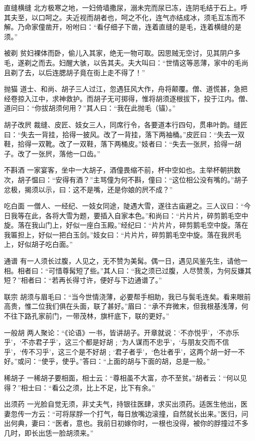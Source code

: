 \documentclass[12pt,UTF8]{ctexbook}
\begin{document}
直缝横缝
北方极寒之地，一妇倚墙撒尿，溺未完而尿已冻，连阴毛结于石上。呼其夫至，以口呵之。夫近视而胡者也，呵之不化，连气亦结成冰，须毛互冻而不解。乃命家僮凿开，吩咐曰：“看仔细子下凿，连着直缝的是毛，连着横缝的是须。”

被剃
贫妇裸体而卧，偷儿入其家，绝无一物可取。因思贼无空讨，见其阴户多毛，遂剃之而去。妇醒大骇，以告其夫。夫大叫曰：“世情这等恶薄，家中的毛尚且剃了去，以后连腮胡子竟在街上走不得了！”

抛猫
道士、和尚、胡子三人过江，忽遇狂风大作，舟将颠覆。僧、道慌甚，急把经卷掠入江中，求神救护。而胡子无可掷得，惟将胡须逐根拔下，投于江内。僧、道问曰：“你拔胡须何用？”其人曰：“我在此抛毛（锚）。”

胡子改屄
裁缝、皮匠、妓女三人，同席行令，各要道本行四句，贯串叶韵。缝匠曰：“失去一背挂，拾得一披风。改了一背挂，落下两袖桶。”皮匠曰：“失去一双鞋，拾得一双靴。改了一双鞋，落下两桶皮。”妓者曰：“失去一张屄，拾得一胡子。改了一张屄，落他一口齿。”

不斟酒
一家宴客，坐中一大胡子，酒僮畏缩不前，杯中空如也。主举杯朝拱数次，胡子愠曰：“安得有酒？”主骂僮为何不斟，僮曰：“这位相公没有嘴的。”胡子忿极，揭须以示，曰：这不是嘴，还是你娘的屄不成？”

吃白面
一僧人、一经纪、一妓女同途，陡遇大雪，遂往古庙避之。三人议曰：“今日我等在此，各将大雪为题，要插入自家本色。”和尚曰：“片片片，碎剪鹅毛空中旋。落在我山门上，好似一座白玉殿。”经纪曰：“片片片，碎剪鹅毛空中旋。落在我匾担上，好似一把白玉剑。”妓女曰：“片片片，碎剪鹅毛空中旋。落在我屄毛上，好似胡子吃白面。”

通谱
有一人须长过腹，人见之，无不赞为美髯。偶一日，遇见风鉴先生，请他一相。相者曰：“可惜尊髯短了些。”其人曰：“我之须已过腹，人尽赞羡，为何反嫌其短？”相者曰：“若再长得寸许，便好与下边通谱了。”

联宗
胡须与眉毛曰：“当今世情浇薄，必要帮手相助，我已与鬓毛连矣。看来眼前高贵，惟二位我们俱在头面，联了甚好。”眉曰：“承不弃微末，但我根基浅薄，何不往下路孔家前门，一带茂林，旗杆底下，联的更好。”

一般胡
两人聚论：“《论语》一书，皆讲胡子。开章就说：‘不亦悦乎’，‘不亦乐乎’，‘不亦君子乎’，这三个都是好胡﹔‘为人谋而不忠乎’，‘与朋友交而不信乎’，‘传不习乎’，这三个是不好胡﹔‘君子者乎’，‘色壮者乎’，这两个胡一好一不好。”或问：“使乎，使乎。”答曰：“上面的胡与下面的胡，总是一般。”

稀胡子
一稀胡子要相面，相士云：“尊相虽不大富，亦不至贫。”胡者云：“何以见得？”相士曰：“看公之须，比上不足，比下有余。”

出须药
一光脸自觉无须，非丈夫气，持银往医肆，求买出须药。适医生他出，医妻忽传一方云：“可将尿脬一个打气，每日放嘴边滚撞，自然就长出来。”医归，问出何典，妻曰：“医者，意也。我前日初嫁你时，一根也没得，被你的脬撞过不多几时，即长出恁一脸胡须来。”
\end{document}
